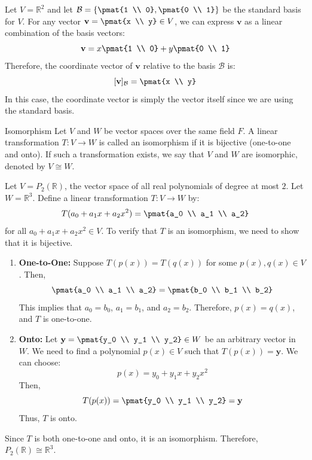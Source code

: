 \documentclass[openany]{book}
\begin{document}
\begin{example}
    Let $V = \mathbb{R}^2$ and let $\mathcal{B} = \left\{\pmat{1 \\ 0}, \pmat{0 \\ 1}\right\}$ be the standard basis for $V$. For any vector $\mathbf{v} = \pmat{x \\ y} \in V$, we can express $\mathbf{v}$ as a linear combination of the basis vectors:
    $$\mathbf{v} = x \pmat{1 \\ 0} + y \pmat{0 \\ 1}$$
    Therefore, the coordinate vector of $\mathbf{v}$ relative to the basis $\mathcal{B}$ is:
    $$[\mathbf{v}]_{\mathcal{B}} = \pmat{x \\ y}$$
    In this case, the coordinate vector is simply the vector itself since we are using the standard basis. \\
\end{example}
\begin{mydefinition}{Isomorphism}
    Let $V$ and $W$ be vector spaces over the same field $F$. A linear transformation $T: V \to W$ is called an isomorphism if it is bijective (one-to-one and onto). If such a transformation exists, we say that $V$ and $W$ are isomorphic, denoted by $V \cong W$.
\end{mydefinition}
\begin{example}
    Let $V = P_2(\mathbb{R})$, the vector space of all real polynomials of degree at most $2$. Let $W = \mathbb{R}^3$. Define a linear transformation $T: V \to W$ by:
    $$T(a_0 + a_1 x + a_2 x^2) = \pmat{a_0 \\ a_1 \\ a_2}$$
    for all $a_0 + a_1 x + a_2 x^2 \in V$. To verify that $T$ is an isomorphism, we need to show that it is bijective.
    \begin{enumerate}
        \item \textbf{One-to-One:} Suppose $T(p(x)) = T(q(x))$ for some $p(x), q(x) \in V$. Then,
        $$\pmat{a_0 \\ a_1 \\ a_2} = \pmat{b_0 \\ b_1 \\ b_2}$$
        This implies that $a_0 = b_0$, $a_1 = b_1$, and $a_2 = b_2$. Therefore, $p(x) = q(x)$, and $T$ is one-to-one.

        \item \textbf{Onto:} Let $\mathbf{y} = \pmat{y_0 \\ y_1 \\ y_2} \in W$ be an arbitrary vector in $W$. We need to find a polynomial $p(x) \in V$ such that $T(p(x)) = \mathbf{y}$. We can choose:
        $$p(x) = y_0 + y_1 x + y_2 x^2$$
        Then,
        $$T(p(x)) = \pmat{y_0 \\ y_1 \\ y_2} = \mathbf{y}$$
        Thus, $T$ is onto.
    \end{enumerate}
    Since $T$ is both one-to-one and onto, it is an isomorphism. Therefore, $P_2(\mathbb{R}) \cong \mathbb{R}^3$.
\end{example}
\end{document}
